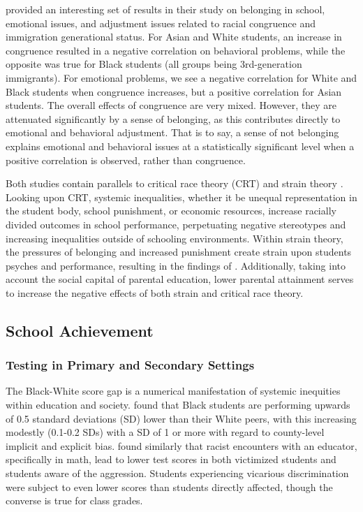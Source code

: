 \documentclass[jou,12pt,floatsintext]{apa7}
\begin{document}
\textcite{georgiades_emotional_2013} provided an interesting set of results in their study on belonging in school, emotional issues, and adjustment issues related to racial congruence and immigration generational status. For Asian and White students, an increase in congruence resulted in a negative correlation on behavioral problems, while the opposite was true for Black students (all groups being 3rd-generation immigrants). For emotional problems, we see a negative correlation for White and Black students when congruence increases, but a positive correlation for Asian students. The overall effects of congruence are very mixed. However, they are attenuated significantly by a sense of belonging, as this contributes directly to emotional and behavioral adjustment. That is to say, a sense of not belonging explains emotional and behavioral issues at a statistically significant level when a positive correlation is observed, rather than congruence.

Both studies contain parallels to critical race theory (CRT) and strain theory \parencite{bottiani_multilevel_2017, georgiades_emotional_2013, delgado_critical_2020}. Looking upon CRT, systemic inequalities, whether it be unequal representation in the student body, school punishment, or economic resources, increase racially divided outcomes in school performance, perpetuating negative stereotypes and increasing inequalities outside of schooling environments. Within strain theory, the pressures of belonging and increased punishment create strain upon students psyches and performance, resulting in the findings of \textcite{georgiades_emotional_2013}. Additionally, taking into account the social capital of parental education, lower parental attainment serves to increase the negative effects of both strain and critical race theory.

\subsection{School Achievement}
\subsubsection{Testing in Primary and Secondary Settings}
The Black-White score gap is a numerical manifestation of systemic inequities within education and society. \textcite{pearman_collective_2022} found that Black students are performing upwards of 0.5 standard deviations (SD) lower than their White peers, with this increasing modestly (0.1-0.2 SDs) with a SD of 1 or more with regard to county-level implicit and explicit bias. \textcite{del_toro_when_2024} found similarly that racist encounters with an educator, specifically in math, lead to lower test scores in both victimized students and students aware of the aggression. Students experiencing vicarious discrimination were subject to even lower scores than students directly affected, though the converse is true for class grades.
\end{document}
